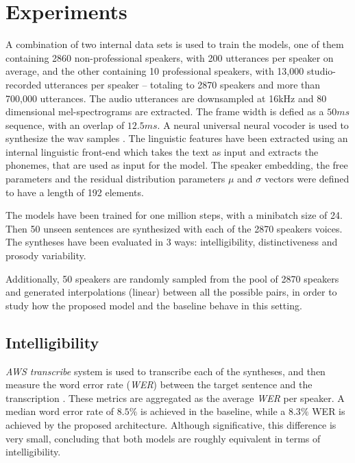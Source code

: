 \section{Experiments}
 A combination of two internal data sets is used to train the models, one of them containing 2860 non-professional speakers, with 200 utterances per speaker on average, and the other containing 10 professional speakers, with 13,000 studio-recorded utterances per speaker – totaling to 2870 speakers and more than 700,000 utterances. The audio utterances are downsampled at 16kHz and 80 dimensional mel-spectrograms are extracted. The frame width is defied as a $50ms$ sequence, with an overlap of $12.5ms$. A neural universal neural vocoder is used to synthesize the wav samples \autocite{lorenzotrueba2019}. The linguistic features have been extracted using an internal linguistic front-end which takes the text as input and extracts the phonemes, that are used as input for the model. The speaker embedding, the free parameters and the residual distribution parameters $\mu$ and $\sigma$ vectors were defined to have a length of 192 elements.

 The models have been trained for one million steps, with a minibatch size of 24. Then 50 unseen sentences are synthesized with each of the 2870 speakers voices. The syntheses have been evaluated in 3 ways: intelligibility, distinctiveness and prosody variability.

 Additionally, 50 speakers are randomly sampled from the pool of 2870 speakers and generated interpolations (linear) between all the possible pairs, in order to study how the proposed model and the baseline behave in this setting.

 \subsection{Intelligibility}
\textit{AWS transcribe} system is used to transcribe each of the syntheses, and then measure the word error rate (\textit{WER}) between the target sentence and the transcription \autocite{uday2019}. These metrics are aggregated as the average \textit{WER} per speaker. A median word error rate of $8.5\%$ is achieved in the baseline, while a $8.3\%$ WER is achieved by the proposed architecture. Although significative, this difference is very small, concluding that both models are roughly equivalent in terms of intelligibility.


